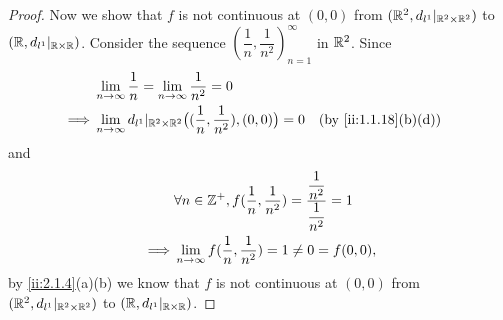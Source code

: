 \begin{proof}
  Now we show that \(f\) is not continuous at \((0, 0)\) from \((\mathbb{R}^2, d_{l^1}|_{\mathbb{R}^2 \times \mathbb{R}^2})\) to \((\mathbb{R}, d_{l^1}|_{\mathbb{R} \times \mathbb{R}})\).
  Consider the sequence \((\dfrac{1}{n}, \dfrac{1}{n^2})_{n = 1}^\infty\) in \(\mathbb{R}^2\).
  Since
  \begin{align*}
             & \lim_{n \to \infty} \dfrac{1}{n} = \lim_{n \to \infty} \dfrac{1}{n^2} = 0                                                    \\
    \implies & \lim_{n \to \infty} d_{l^1}|_{\R^2 \times \R^2}\big((\dfrac{1}{n}, \dfrac{1}{n^2}), (0, 0)\big) = 0 &  & \by{ii:1.1.18}[b,d]
  \end{align*}
  and
  \begin{align*}
             & \forall n \in \mathbb{Z}^+, f(\dfrac{1}{n}, \dfrac{1}{n^2}) = \dfrac{\dfrac{1}{n^2}}{\dfrac{1}{n^2}} = 1 \\
    \implies & \lim_{n \to \infty} f(\dfrac{1}{n}, \dfrac{1}{n^2}) = 1 \neq 0 = f(0, 0),
  \end{align*}
  by \cref{ii:2.1.4}(a)(b) we know that \(f\) is not continuous at \((0, 0)\) from \((\mathbb{R}^2, d_{l^1}|_{\mathbb{R}^2 \times \mathbb{R}^2})\) to \((\mathbb{R}, d_{l^1}|_{\mathbb{R} \times \mathbb{R}})\).
\end{proof}
